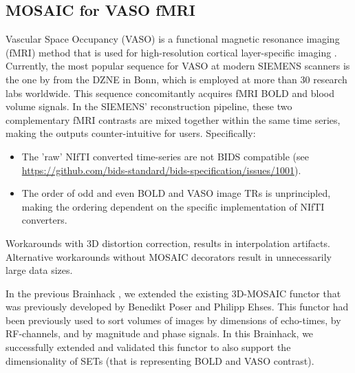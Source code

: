 \documentclass[../main.tex]{subfiles}
\begin{document}
\subsection{MOSAIC for VASO fMRI} 

%

Vascular Space Occupancy (VASO) is a functional magnetic resonance imaging (fMRI) method that is used for high-resolution cortical layer-specific imaging \parencite{Huber2021a}. Currently, the most popular sequence for VASO at modern SIEMENS scanners is the one by \textcite{Stirnberg2021a} from the DZNE in Bonn, which is employed at more than 30 research labs worldwide. This sequence concomitantly acquires fMRI BOLD and blood volume signals. In the SIEMENS' reconstruction pipeline, these two complementary fMRI contrasts are mixed together within the same time series, making the outputs counter-intuitive for users. Specifically:

\begin{itemize}
    \item The 'raw' NIfTI converted time-series are not BIDS compatible (see \href{https://github.com/bids-standard/bids-specification/issues/1001}{https://github.com/bids-standard/bids-specification/issues/1001}).
    
    \item The order of odd and even BOLD and VASO image TRs is unprincipled, making the ordering dependent on the specific implementation of NIfTI converters.
\end{itemize}

Workarounds with 3D distortion correction, results in interpolation artifacts. Alternative workarounds without MOSAIC decorators result in unnecessarily large data sizes.

In the previous Brainhack \parencite{Gau2021}, we extended the existing 3D-MOSAIC functor that was previously developed by Benedikt Poser and Philipp Ehses. This functor had been previously used to sort volumes of images by dimensions of echo-times, by RF-channels, and by magnitude and phase signals. In this Brainhack, we successfully extended and validated this functor to also support the dimensionality of SETs (that is representing BOLD and VASO contrast).
\end{document}
